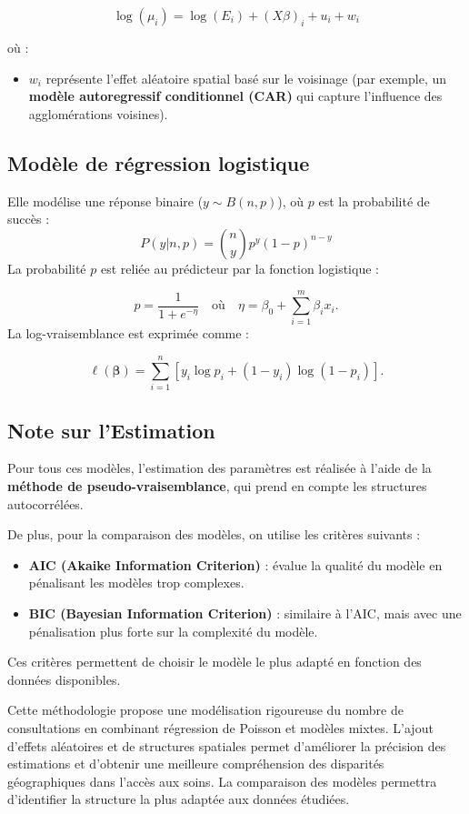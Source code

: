 \documentclass[
]{article}
\providecommand{\tightlist}{%
  \setlength{\itemsep}{0pt}\setlength{\parskip}{0pt}}
\begin{document}
\[
\log(\mu_i) = \log(E_i) + (X\beta)_i + u_i + w_i
\]

où :

\begin{itemize}
\tightlist
\item
  \(w_i\) représente l'effet aléatoire spatial basé sur le voisinage
  (par exemple, un \textbf{modèle autoregressif conditionnel (CAR)} qui
  capture l'influence des agglomérations voisines).
\end{itemize}

\subsection{Modèle de régression
logistique}\label{moduxe8le-de-ruxe9gression-logistique}

Elle modélise une réponse binaire (\(y \sim B(n, p)\)), où \(p\) est la
probabilité de succès : \[
P(y | n, p) = \binom{n}{y} p^y (1-p)^{n-y}
\] La probabilité \(p\) est reliée au prédicteur par la fonction
logistique :

\[
p = \frac{1}{1 + e^{-\eta}} \quad \text{où} \quad \eta = \beta_0 + \sum_{i=1}^m \beta_i x_i.
\] La log-vraisemblance est exprimée comme :

\[
\ell(\boldsymbol{\beta}) = \sum_{i=1}^n \left[ y_i \log{p_i} + (1-y_i) \log{(1-p_i)} \right].
\]

\subsection{Note sur l'Estimation}\label{note-sur-lestimation}

Pour tous ces modèles, l'estimation des paramètres est réalisée à l'aide
de la \textbf{méthode de pseudo-vraisemblance}, qui prend en compte les
structures autocorrélées.

De plus, pour la comparaison des modèles, on utilise les critères
suivants :

\begin{itemize}
\tightlist
\item
  \textbf{AIC (Akaike Information Criterion)} : évalue la qualité du
  modèle en pénalisant les modèles trop complexes.
\item
  \textbf{BIC (Bayesian Information Criterion)} : similaire à l'AIC,
  mais avec une pénalisation plus forte sur la complexité du modèle.
\end{itemize}

Ces critères permettent de choisir le modèle le plus adapté en fonction
des données disponibles.

Cette méthodologie propose une modélisation rigoureuse du nombre de
consultations en combinant régression de Poisson et modèles mixtes.
L'ajout d'effets aléatoires et de structures spatiales permet
d'améliorer la précision des estimations et d'obtenir une meilleure
compréhension des disparités géographiques dans l'accès aux soins. La
comparaison des modèles permettra d'identifier la structure la plus
adaptée aux données étudiées.
\end{document}
